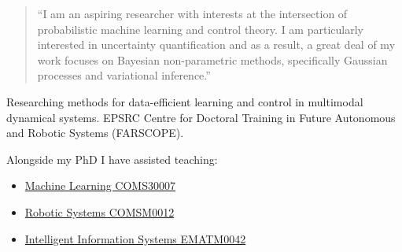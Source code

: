 \documentclass[10pt,a4paper,ragged2e,withhyper]{altacv}
\author{Eid Alkhaldi}
\date{\today}
\title{}
\begin{document}

\makecvheader

\begin{paracol}{2}
\begin{quote}
``I am an aspiring researcher with interests at the intersection of probabilistic machine learning and control theory. I am particularly interested in uncertainty quantification and as a result, a great deal of my work focuses on Bayesian non-parametric methods, specifically Gaussian processes and variational inference.''
\end{quote}
\label{sec:org39b9d0b}

Researching methods for data-efficient learning and control in multimodal dynamical systems. EPSRC Centre for Doctoral Training in Future Autonomous and Robotic Systems (FARSCOPE).


\par\divider
{}

Alongside my PhD I have assisted teaching:
\begin{itemize}
\item \href{https://www.bris.ac.uk/unit-programme-catalogue/UnitDetails.jsa?ayrCode=19\%2F20\&unitCode=COMS30007}{Machine Learning COMS30007}
\item \href{https://www.bris.ac.uk/unit-programme-catalogue/UnitDetails.jsa?ayrCode=19\%2F20\&unitCode=COMSM0012}{Robotic Systems COMSM0012}
\item \href{https://www.bris.ac.uk/unit-programme-catalogue/UnitDetails.jsa?ayrCode=19/20\\\&unitCode=EMATM0042}{Intelligent Information Systems EMATM0042}
\end{itemize}


\label{sec:org7da063f}


\end{paracol}
\end{document}
